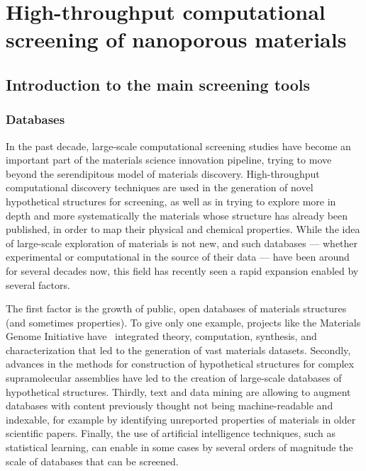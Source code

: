 \documentclass[main.tex]{subfiles}
\begin{document}
\chapter{High-throughput computational screening of nanoporous materials}
\vspace*{-1\baselineskip}


\section{Introduction to the main screening tools}

\subsection{Databases}


In the past decade, large-scale computational screening studies have become an important part of the materials science innovation pipeline,\cite{Hautier_2019, Cole_2020} trying to move beyond the serendipitous model of materials discovery.\cite{Ludwig_2019, Stein_2019} High-throughput computational discovery techniques are used in the generation of novel hypothetical structures for screening,\cite{Wilmer_2012, Boyd_2016} as well as in trying to explore more in depth and more systematically the materials whose structure has already been published, in order to map their physical and chemical properties.\cite{GomezGualdron_2014,Moliner_2019,SalcedoPerez_2019} While the idea of large-scale exploration of materials is not new, and such databases --- whether experimental or computational in the source of their data --- have been around for several decades now,\cite{PDB_1971, Grazulis_2009, Groom_2016} this field has recently seen a rapid expansion enabled by several factors. 

The first factor is the growth of public, open databases of materials structures (and sometimes properties).\cite{Coudert_2019} To give only one example, projects like the Materials Genome Initiative have~\cite{dePablo_2014, dePablo_2019} integrated theory, computation, synthesis, and characterization that led to the generation of vast materials datasets.\cite{Jain_2013, Jain_2016} Secondly, advances in the methods for construction of hypothetical structures for complex supramolecular assemblies have led to the creation of large-scale databases of hypothetical structures.\cite{Foster_2004, Wilmer_2013,Boyd_2016} Thirdly, text and data mining are allowing to augment databases with content previously thought not being machine-readable and indexable, for example by identifying unreported properties of materials in older scientific papers.\cite{Tshitoyan_2019, Court_2020} Finally, the use of artificial intelligence techniques, such as statistical learning,\cite{Butler_2018} can enable in some cases by several orders of magnitude the scale of databases that can be screened.\cite{Kim_2017, Borboudakis_2017, Chibani_2020}
\end{document}
